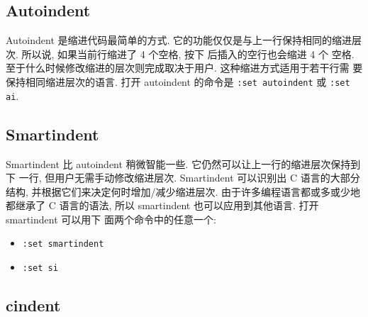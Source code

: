 \subsection{Autoindent}
\label{subsec:autoindent}

Autoindent 是缩进代码最简单的方式. 它的功能仅仅是与上一行保持相同的缩进层次.
所以说, 如果当前行缩进了 4 个空格, 按下  后插入的空行也会缩进 4 个
空格. 至于什么时候修改缩进的层次则完成取决于用户. 这种缩进方式适用于若干行需
要保持相同缩进层次的语言. 打开 autoindent 的命令是 \texttt{:set autoindent}
或 \texttt{:set ai}.

\subsection{Smartindent}
\label{subsec:smartindent}

Smartindent 比 autoindent 稍微智能一些. 它仍然可以让上一行的缩进层次保持到下
一行, 但用户无需手动修改缩进层次. Smartindent 可以识别出 C 语言的大部分结构,
并根据它们来决定何时增加/减少缩进层次. 由于许多编程语言都或多或少地都继承了 C
语言的语法, 所以 smartindent 也可以应用到其他语言. 打开 smartindent 可以用下
面两个命令中的任意一个:
\begin{itemize}
    \item \texttt{:set smartindent}
    \item \texttt{:set si}
\end{itemize}

\subsection{cindent}
\label{subsec:cindent}


